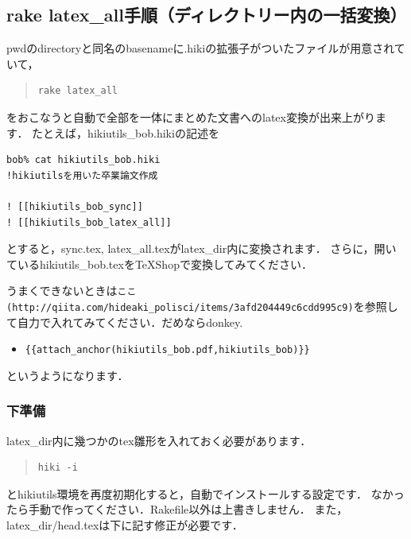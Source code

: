 \subsection{rake latex\_all手順（ディレクトリー内の一括変換）}
pwdのdirectoryと同名のbasenameに.hikiの拡張子がついたファイルが用意されていて，
\begin{quote}\begin{verbatim}
rake latex_all
\end{verbatim}\end{quote}
をおこなうと自動で全部を一体にまとめた文書へのlatex変換が出来上がります．
たとえば，hikiutils\_bob.hikiの記述を
\begin{lstlisting}[style=customCsh,basicstyle={\scriptsize\ttfamily}]
bob% cat hikiutils_bob.hiki 
!hikiutilsを用いた卒業論文作成

! [[hikiutils_bob_sync]]
! [[hikiutils_bob_latex_all]]

\end{lstlisting}
とすると，sync.tex, latex\_all.texがlatex\_dir内に変換されます．
さらに，開いているhikiutils\_bob.texをTeXShopで変換してみてください．

うまくできないときは\verb|ここ(http://qiita.com/hideaki_polisci/items/3afd204449c6cdd995c9)|を参照して自力で入れてみてください．だめならdonkey.

\begin{itemize}
\item \verb|{{attach_anchor(hikiutils_bob.pdf,hikiutils_bob)}}|
\end{itemize}
というようになります．

\subsubsection{下準備}
latex\_dir内に幾つかのtex雛形を入れておく必要があります．
\begin{quote}\begin{verbatim}
hiki -i
\end{verbatim}\end{quote}
とhikiutils環境を再度初期化すると，自動でインストールする設定です．
なかったら手動で作ってください．Rakefile以外は上書きしません．
また，latex\_dir/head.texは下に記す修正が必要です．

